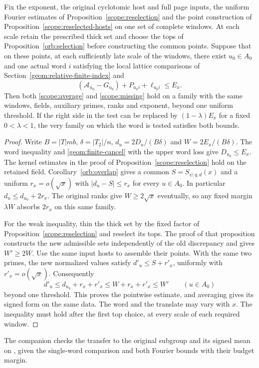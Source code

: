\begin{corollary}\label{scope:one-word}
Fix the exponent, the original cyclotomic host and full page inputs,
the uniform Fourier estimates of Proposition~\ref{scope:reselection}
and the point construction of Proposition~\ref{scope:reselected-hosts}
on one set of complete windows. At each scale retain the prescribed
thick set and choose the tops of Proposition~\ref{orb:selection}
before constructing the common points. Suppose that on these points,
at each sufficiently late scale of the windows, there exist
\(u_0\in A_0\) and one actual word \(i\) satisfying the local lattice
comparisons of Section~\ref{geom:relative-finite-index} and
\[
       (\mathcal A_{u_0}-G_{u_0})+P_{u_0i}+\ell_{u_0i}
                    \le E_x .
\]
Then both \eqref{scope:average} and \eqref{scope:missing} hold on a
family with the same windows, fields, auxiliary primes, ranks and
exponent, beyond one uniform threshold. If the right side in the test
can be replaced by \((1-\lambda)E_x\) for a fixed \(0<\lambda<1\),
the very family on which the word is tested satisfies both bounds.
\end{corollary}
\begin{proof}
Write \(B=|T|mb\), \(\delta=|T_2|/n\),
\(d_u=2D_u/(B\delta)\) and \(W=2E_x/(B\delta)\).
The word inequality and \eqref{geom:finite-cancel} with the upper
word loss give \(D_{u_0}\le E_x\). The kernel estimates in the
proof of Proposition~\ref{scope:reselection} hold on the retained
field. Corollary~\ref{orb:overlap} gives a common
\(S=S_{\psi;q,d}(x)\) and a uniform \(r_x=o(\sqrt{x})\) with
\(|d_u-S|\le r_x\) for every \(u\in A_0\).
In particular \(d_u\le d_{u_0}+2r_x\).
The original ranks give \(W\ge2\sqrt{x}\) eventually, so any
fixed margin \(\lambda W\) absorbs \(2r_x\) on this same family.

For the weak inequality, thin the thick set by the fixed factor of
Proposition~\ref{scope:reselection} and reselect its tops. The proof
of that proposition constructs the new admissible sets independently
of the old discrepancy and gives \(W'\ge2W\). Use the same input
hosts to assemble their points. With the same two primes, the new
normalized values satisfy \(d'_u\le S+r'_x\), uniformly with
\(r'_x=o(\sqrt{x})\). Consequently
\[
              d'_u\le d_{u_0}+r_x+r'_x\le W+r_x+r'_x\le W'
                        \qquad (u\in A_0)
\]
beyond one threshold. This proves the pointwise estimate, and
averaging gives its signed form on the same data. The word and the
translate may vary with \(x\). The inequality must hold after the
first top choice, at every scale of each required window.
\end{proof}
The companion  checks the transfer to the
original subgroup and its signed mean on , given the
single-word comparison and both Fourier bounds with their budget margin.


